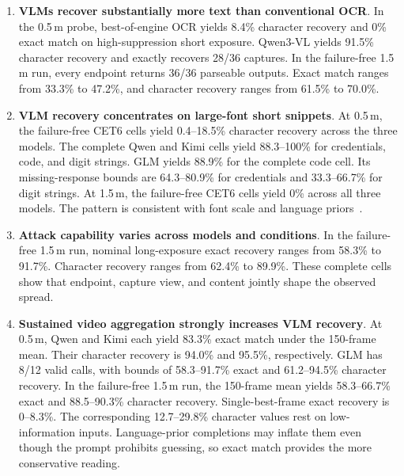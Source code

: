 \documentclass{ieeeaccess}
\begin{document}
\begin{enumerate}
\item \textbf{VLMs recover substantially more text than conventional OCR}. In the 0.5\,m probe, best-of-engine OCR yields 8.4\% character recovery and 0\% exact match on high-suppression short exposure. Qwen3-VL yields 91.5\% character recovery and exactly recovers 28/36 captures. In the failure-free 1.5\,m run, every endpoint returns 36/36 parseable outputs. Exact match ranges from 33.3\% to 47.2\%, and character recovery ranges from 61.5\% to 70.0\%.

\item \textbf{VLM recovery concentrates on large-font short snippets}. At 0.5\,m, the failure-free CET6 cells yield 0.4--18.5\% character recovery across the three models. The complete Qwen and Kimi cells yield 88.3--100\% for credentials, code, and digit strings. GLM yields 88.9\% for the complete code cell. Its missing-response bounds are 64.3--80.9\% for credentials and 33.3--66.7\% for digit strings. At 1.5\,m, the failure-free CET6 cells yield 0\% across all three models. The pattern is consistent with font scale and language priors~\cite{b_shi2023,b_jiang2025}.

\item \textbf{Attack capability varies across models and conditions}. In the failure-free 1.5\,m run, nominal long-exposure exact recovery ranges from 58.3\% to 91.7\%. Character recovery ranges from 62.4\% to 89.9\%. These complete cells show that endpoint, capture view, and content jointly shape the observed spread.

\item \textbf{Sustained video aggregation strongly increases VLM recovery}. At 0.5\,m, Qwen and Kimi each yield 83.3\% exact match under the 150-frame mean. Their character recovery is 94.0\% and 95.5\%, respectively. GLM has 8/12 valid calls, with bounds of 58.3--91.7\% exact and 61.2--94.5\% character recovery. In the failure-free 1.5\,m run, the 150-frame mean yields 58.3--66.7\% exact and 88.5--90.3\% character recovery. Single-best-frame exact recovery is 0--8.3\%. The corresponding 12.7--29.8\% character values rest on low-information inputs. Language-prior completions may inflate them even though the prompt prohibits guessing, so exact match provides the more conservative reading.
\end{enumerate}

\end{document}
